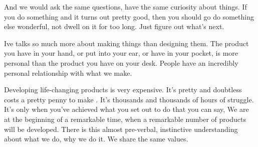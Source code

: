 And we would ask the same questions, have the same curiosity about things.
If you do something and it turns out pretty good, then you should go do something else wonderful, not dwell on it for too long. Just figure out what's next.

Ive talks so much more about making things than designing them.
The product you have in your hand, or put into your ear, or have in your pocket, is more personal than the product you have on your desk.
People have an incredibly personal relationship with what we make.

Developing life-changing products is very expensive.
It's pretty and doubtless costs a pretty penny to make .
It's thousands and thousands of hours of struggle. It's only when you've achieved what you set out to do that you can say,
We are at the beginning of a remarkable time, when a remarkable number of products will be developed. 
There is this almost pre-verbal, instinctive understanding about what we do, why we do it. We share the same values.

